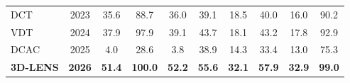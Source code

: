 \documentclass[border=4pt]{standalone}
\begin{document}
\begin{tabular}{l c cccc cccc}
            DCT & 2023
            & 35.6 & 88.7 & 36.0 & 39.1
            & 18.5 & 40.0 & 16.0 & 90.2 \\

            VDT & 2024
            & 37.9 & 97.9 & 39.1 & 43.7
            & 18.1 & 43.2 & 17.8 & 92.9 \\

            DCAC & 2025
            & 4.0 & 28.6 & 3.8 & 38.9
            & 14.3 & 33.4 & 13.0 & 75.3 \\

            \midrule

            \textbf{3D-LENS} & \textbf{2026}
            & \textbf{51.4} & \textbf{100.0} & \textbf{52.2} & \textbf{55.6}
            & \textbf{32.1} & \textbf{57.9} & \textbf{32.9} & \textbf{99.0} \\

            \bottomrule
        \end{tabular}
\end{document}

